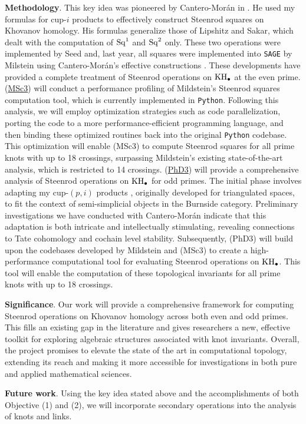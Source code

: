 \smallskip\noindent\textbf{Methodology}.
This key idea was pioneered by Cantero-Mor\'an in \cite{cantero-moran2020khovanov}.
He used my formulas for cup-$i$ products \cite{medina2023fast_sq} to effectively construct Steenrod squares on Khovanov homology.
His formulas generalize those of Lipshitz and Sakar, which dealt with the computation of $\operatorname{Sq}^1$ and $\operatorname{Sq}^2$ \cite{lipshitz2014steenrod} only.
These two operations were implemented by Seed \cite{seed2012khovanov} and, last year, all squares were implemented into \texttt{SAGE} by Milstein using Cantero-Mor\'an's effective constructions \cite{milstein2022khovanov}.
These developments have provided a complete treatment of Steenrod operations on $\mathrm{KH}_\bullet$ at the even prime.
(\underline{MSc3}) will conduct a performance profiling of Mildstein's Steenrod squares computation tool, which is currently implemented in \texttt{Python}.
Following this analysis, we will employ optimization strategies such as code parallelization, porting the code to a more performance-efficient programming language, and then binding these optimized routines back into the original \texttt{Python} codebase.
This optimization will enable (MSc3) to compute Steenrod squares for all prime knots with up to 18 crossings, surpassing Mildstein's existing state-of-the-art analysis, which is restricted to 14 crossings.
(\underline{PhD3}) will provide a comprehensive analysis of Steenrod operations on $\mathrm{KH}_\bullet$ for odd primes.
The initial phase involves adapting my cup-$(p,i)$ products \cite{medina2021may_st}, originally developed for triangulated spaces, to fit the context of semi-simplicial objects in the Burnside category.
Preliminary investigations we have conducted with Cantero-Mor\'an indicate that this adaptation is both intricate and intellectually stimulating, revealing connections to Tate cohomology and cochain level stability.
Subsequently, (PhD3) will build upon the codebases developed by Mildstein and (MSc3) to create a high-performance computational tool for evaluating Steenrod operations on $\mathrm{KH}_\bullet$.
This tool will enable the computation of these topological invariants for all prime knots with up to 18 crossings.

\smallskip\textbf{Significance}.
Our work will provide a comprehensive framework for computing Steenrod operations on Khovanov homology across both even and odd primes.
This fills an existing gap in the literature and gives researchers a new, effective toolkit for exploring algebraic structures associated with knot invariants.
Overall, the project promises to elevate the state of the art in computational topology, extending its reach and making it more accessible for investigations in both pure and applied mathematical sciences.

\smallskip\textbf{Future work}.
Using the key idea stated above and the accomplishments of both Objective (1) and (2), we will incorporate secondary operations into the analysis of knots and links.